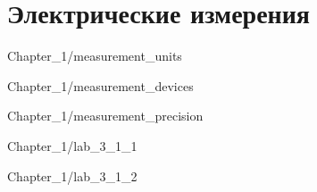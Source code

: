 \chapter{Электрические измерения}


 {Chapter_1/measurement_units}

 {Chapter_1/measurement_devices}

 {Chapter_1/measurement_precision}

\newpage


 {Chapter_1/lab_3_1_1}

 {Chapter_1/lab_3_1_2}

